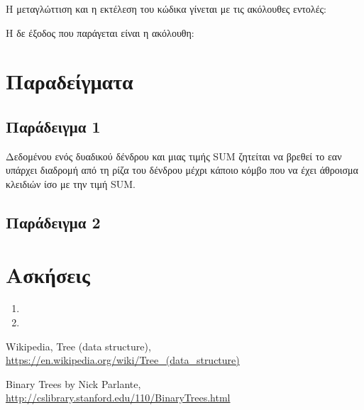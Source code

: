 Η μεταγλώττιση και η εκτέλεση του κώδικα γίνεται με τις ακόλουθες εντολές:

%

Η δε έξοδος που παράγεται είναι η ακόλουθη:

%


\section{Παραδείγματα}

\subsection{Παράδειγμα 1}

Δεδομένου ενός δυαδικού δένδρου και μιας τιμής SUM ζητείται να βρεθεί το εαν υπάρχει διαδρομή από τη ρίζα του δένδρου μέχρι κάποιο κόμβο που να έχει άθροισμα κλειδιών ίσο με την τιμή SUM.

\subsection{Παράδειγμα 2}


\section{Ασκήσεις}
\begin{enumerate}
\item 
\item 
\end{enumerate}

\begin{thebibliography}{9}
Wikipedia, Tree (data structure), \href{https://en.wikipedia.org/wiki/Tree_(data_structure)}{https://en.wikipedia.org/wiki/Tree\_(data\_structure)}

Binary Trees by Nick Parlante, \href{http://cslibrary.stanford.edu/110/BinaryTrees.html}{http://cslibrary.stanford.edu/110/BinaryTrees.html}

\end{thebibliography}

